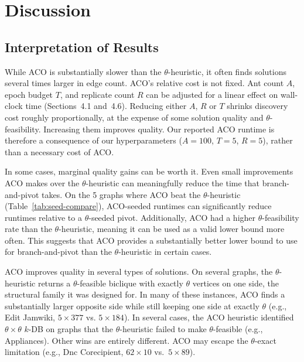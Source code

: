 \documentclass[conference]{IEEEtran}
\begin{document}


\FloatBarrier
\section{Discussion}


\subsection{Interpretation of Results}


While ACO is substantially slower than the $\theta$-heuristic, it often finds solutions several times larger in edge count. ACO's relative cost is not fixed. Ant count $A$, epoch budget $T$, and replicate count $R$ can be adjusted for a linear effect on wall-clock time (Sections~4.1 and~4.6). Reducing either $A$, $R$ or $T$ shrinks discovery cost roughly proportionally, at the expense of some solution quality and $\theta$-feasibility. Increasing them improves quality. Our reported ACO runtime is therefore a consequence of our hyperparameters ($A = 100$, $T = 5$, $R = 5$), rather than a necessary cost of ACO.


In some cases, marginal quality gains can be worth it. Even small improvements ACO makes over the $\theta$-heuristic can meaningfully reduce the time that branch-and-pivot takes. On the 5 graphs where ACO beat the $\theta$-heuristic (Table~\ref{tab:seed-compare}), ACO-seeded runtimes can significantly reduce runtimes relative to a $\theta$-seeded pivot. Additionally, ACO had a higher $\theta$-feasibility rate than the $\theta$-heuristic, meaning it can be used as a valid lower bound more often. This suggests that ACO provides a substantially better lower bound to use for branch-and-pivot than the $\theta$-heuristic in certain cases.


ACO improves quality in several types of solutions. On several graphs, the $\theta$-heuristic returns a $\theta$-feasible biclique with exactly $\theta$ vertices on one side, the structural family it was designed for. In many of these instances, ACO finds a substantially larger opposite side while still keeping one side at exactly $\theta$ (e.g., Edit Jamwiki, $5 \times 377$ vs. $5 \times 184$). In several cases, the ACO heuristic identified $\theta \times \theta$ $k$-DB on graphs that the $\theta$-heuristic failed to make $\theta$-feasible (e.g., Appliances). Other wins are entirely different. ACO may escape the $\theta$-exact limitation (e.g., Dnc Corecipient, $62 \times 10$ vs.\ $5 \times 89$).
\end{document}
